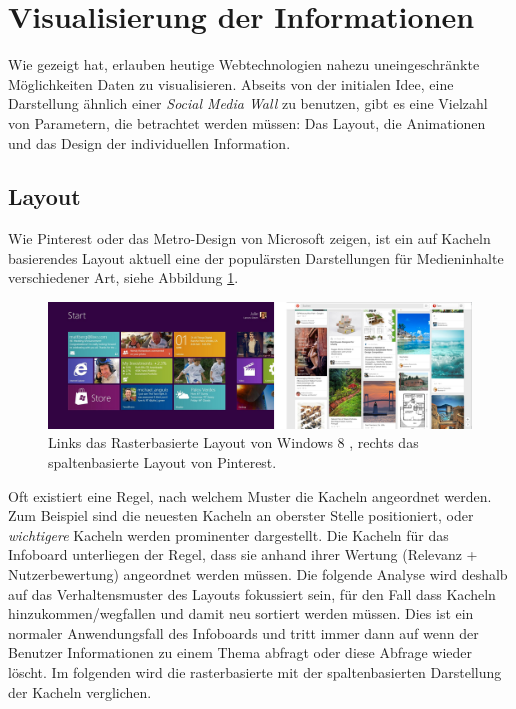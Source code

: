 \documentclass[12pt,twoside]{book}
\begin{document}
\section{Visualisierung der Informationen}\label{chap:concept:wall}

 Wie \cite{bostock2011d3} gezeigt hat, erlauben heutige Webtechnologien nahezu uneingeschränkte Möglichkeiten Daten zu visualisieren. Abseits von der initialen Idee, eine Darstellung ähnlich einer \textit{Social Media Wall} zu benutzen, gibt es eine Vielzahl von Parametern, die betrachtet werden müssen: Das Layout, die Animationen und das Design der individuellen Information.

\subsection{Layout}

Wie Pinterest \cite{pinterest} oder das Metro-Design von Microsoft zeigen, ist ein auf Kacheln  basierendes Layout aktuell eine der populärsten Darstellungen für Medieninhalte verschiedener Art, siehe Abbildung \ref{fig:metro_pinterest}.

\begin{figure}[htbp]
    \centering
    \includegraphics[width=1.0\textwidth]{images/metro_pinterest.png}
    \caption{Links das Rasterbasierte Layout von Windows 8 \cite{metrodesign}, rechts das spaltenbasierte Layout von Pinterest.}
    \label{fig:metro_pinterest}
  \end{figure}

Oft existiert eine Regel, nach welchem Muster die Kacheln angeordnet werden. Zum Beispiel sind die neuesten Kacheln an oberster Stelle positioniert,  oder \textit{wichtigere} Kacheln werden prominenter dargestellt.  Die Kacheln für das Infoboard unterliegen der Regel, dass sie anhand ihrer Wertung (Relevanz + Nutzerbewertung) angeordnet werden müssen. Die folgende Analyse wird deshalb auf das Verhaltensmuster des Layouts fokussiert sein, für den Fall dass Kacheln hinzukommen/wegfallen und damit neu sortiert werden müssen. Dies ist ein normaler Anwendungsfall des Infoboards und tritt immer dann auf wenn der Benutzer Informationen zu einem Thema abfragt oder diese Abfrage wieder löscht.
Im folgenden wird die rasterbasierte mit der spaltenbasierten Darstellung der Kacheln verglichen.
\end{document}
